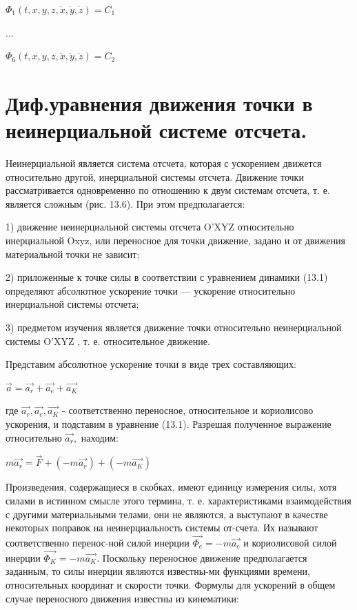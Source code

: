 {\begin{center}
\par $ \Phi_{1}(t,x,y,z, \dot x, \dot y, \dot z) = C_{1}$
\par ...
\par $ \Phi_{6}(t,x,y,z, \dot x, \dot y, \dot z) = C_{2}$
    
\end{center}

\section{Диф.уравнения движения точки в неинерциальной системе отсчета.}
\begin{center}
    \par Неинерциальной является система отсчета, которая с ускорением движется относительно другой, инерциальной системы отсчета. Движение точки рассматривается одновременно по отношению к двум системам отсчета, т. е. является сложным (рис. 13.6). При этом предполагается:
    
    \par 1)  движение  неинерциальной  системы  отсчета O'XYZ   относительно инерциальной Oxyz, или переносное для точки движение, задано и от движения материальной точки не зависит;
    
    \par 2)  приложенные  к  точке  силы  в  соответствии  с  уравнением  динамики (13.1)  определяют  абсолютное  ускорение  точки  —  ускорение  относительно инерциальной системы отсчета;
    
    \par 3) предметом изучения является движение точки относительно неинерциальной системы O'XYZ , т. е. относительное движение.
    
    \par Представим абсолютное ускорение точки в виде трех составляющих:
    
    \par $\vec{a} = \vec{a_r} + \vec{a_e} + \vec{a_K}$
    
    \par где $\vec{a_r}, \vec{a_e}, \vec{a_K}$ - соответственно  переносное,  относительное  и  кориолисово ускорения, и подставим в уравнение (13.1). Разрешая полученное выражение относительно  $\vec{a_r},$ находим:
    
    \par $m \vec{a_r} = \vec{F} + (-m \vec{a_r}) + (-m \vec{a_K})$

    \par Произведения,  содержащиеся  в  скобках, имеют единицу измерения силы, хотя силами в истинном смысле этого термина, т.  е.  характеристиками  взаимодействия  с другими материальными телами, они не являются, а выступают в качестве некоторых поправок на неинерциальность системы от-счета. Их называют соответственно перенос-ной  силой  инерции $\vec{\Phi_e}=-m\vec{a_e}$ и  кориолисовой силой инерции $\vec{\Phi_K}=-m\vec{a_K}$. Поскольку переносное  движение  предполагается  заданным, то силы инерции являются известны-ми  функциями  времени,  относительных координат и скорости точки. Формулы для ускорений  в  общем  случае  переносного движения известны из кинематики:


\end{center}}
